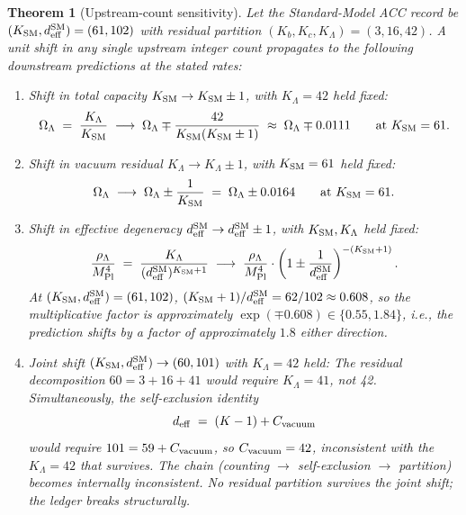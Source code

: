 \documentclass[11pt]{article}
\theoremstyle{plain}
\newtheorem{theorem}{Theorem}[section]
\theoremstyle{definition}
\theoremstyle{remark}
\newcommand{\Mpl}{M_{\rm Pl}}
\begin{document}
\begin{theorem}[Upstream-count sensitivity]\label{thm:sensitivity}
Let the Standard-Model ACC record be $(K_{\rm SM}, d_{\rm eff}^{\rm SM}) = (61, 102)$ with residual partition $(K_b, K_c, K_\Lambda) = (3, 16, 42)$.  A unit shift in any single upstream integer count propagates to the following downstream predictions at the stated rates:

\begin{enumerate}[leftmargin=2.5em,label=(\alph*),itemsep=4pt]
  \item \emph{Shift in total capacity $K_{\rm SM} \to K_{\rm SM} \pm 1$, with $K_\Lambda = 42$ held fixed:}
  \[
    \Omega_\Lambda \;=\; \frac{K_\Lambda}{K_{\rm SM}}
    \;\longrightarrow\;
    \Omega_\Lambda \mp \frac{42}{K_{\rm SM}(K_{\rm SM} \pm 1)}
    \;\approx\;
    \Omega_\Lambda \mp 0.0111
    \qquad \text{at $K_{\rm SM} = 61$}.
  \]
  \item \emph{Shift in vacuum residual $K_\Lambda \to K_\Lambda \pm 1$, with $K_{\rm SM} = 61$ held fixed:}
  \[
    \Omega_\Lambda \;\longrightarrow\; \Omega_\Lambda \pm \frac{1}{K_{\rm SM}}
    \;=\;
    \Omega_\Lambda \pm 0.0164
    \qquad \text{at $K_{\rm SM} = 61$}.
  \]
  \item \emph{Shift in effective degeneracy $d_{\rm eff}^{\rm SM} \to d_{\rm eff}^{\rm SM} \pm 1$, with $K_{\rm SM}, K_\Lambda$ held fixed:}
  \[
    \frac{\rho_\Lambda}{\Mpl^4}
    \;=\; \frac{K_\Lambda}{(d_{\rm eff}^{\rm SM})^{K_{\rm SM} + 1}}
    \;\longrightarrow\;
    \frac{\rho_\Lambda}{\Mpl^4} \cdot \left(1 \pm \frac{1}{d_{\rm eff}^{\rm SM}}\right)^{-(K_{\rm SM} + 1)}.
  \]
  At $(K_{\rm SM}, d_{\rm eff}^{\rm SM}) = (61, 102)$, $(K_{\rm SM} + 1) / d_{\rm eff}^{\rm SM} = 62/102 \approx 0.608$, so the multiplicative factor is approximately $\exp(\mp 0.608) \in \{0.55, 1.84\}$, i.e., the prediction shifts by a factor of approximately $1.8$ either direction.
  \item \emph{Joint shift $(K_{\rm SM}, d_{\rm eff}^{\rm SM}) \to (60, 101)$ with $K_\Lambda = 42$ held:}  The residual decomposition $60 = 3 + 16 + 41$ would require $K_\Lambda = 41$, not 42.  Simultaneously, the self-exclusion identity
  \[
    d_{\rm eff} \;=\; (K - 1) + C_{\rm vacuum}
  \]
  would require $101 = 59 + C_{\rm vacuum}$, so $C_{\rm vacuum} = 42$, inconsistent with the $K_\Lambda = 42$ that survives.  The chain (counting $\to$ self-exclusion $\to$ partition) becomes internally inconsistent.  No residual partition survives the joint shift; the ledger breaks structurally.
\end{enumerate}
\end{theorem}
\end{document}
